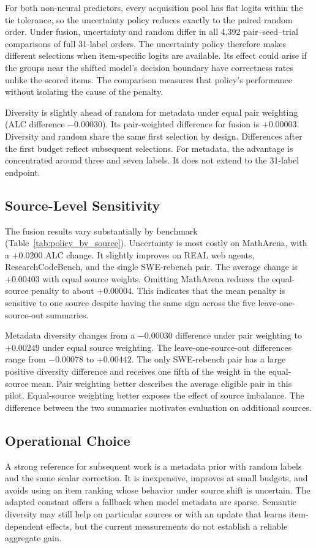 \documentclass[conference]{IEEEtran}
\begin{document}
For both non-neural predictors, every acquisition pool has flat logits within the tie tolerance, so the uncertainty policy reduces exactly to the paired random order. Under fusion, uncertainty and random differ in all 4,392 pair--seed--trial comparisons of full 31-label orders. The uncertainty policy therefore makes different selections when item-specific logits are available. Its effect could arise if the groups near the shifted model's decision boundary have correctness rates unlike the scored items. The comparison measures that policy's performance without isolating the cause of the penalty.

Diversity is slightly ahead of random for metadata under equal pair weighting (ALC difference $-0.00030$). Its pair-weighted difference for fusion is $+0.00003$. Diversity and random share the same first selection by design. Differences after the first budget reflect subsequent selections. For metadata, the advantage is concentrated around three and seven labels. It does not extend to the 31-label endpoint.

\subsection{Source-Level Sensitivity}
The fusion results vary substantially by benchmark (Table~\ref{tab:policy_by_source}). Uncertainty is most costly on MathArena, with a $+0.0200$ ALC change. It slightly improves on REAL web agents, ResearchCodeBench, and the single SWE-rebench pair. The average change is $+0.00403$ with equal source weights. Omitting MathArena reduces the equal-source penalty to about $+0.00004$. This indicates that the mean penalty is sensitive to one source despite having the same sign across the five leave-one-source-out summaries.

Metadata diversity changes from a $-0.00030$ difference under pair weighting to $+0.00249$ under equal source weighting. The leave-one-source-out differences range from $-0.00078$ to $+0.00442$. The only SWE-rebench pair has a large positive diversity difference and receives one fifth of the weight in the equal-source mean. Pair weighting better describes the average eligible pair in this pilot. Equal-source weighting better exposes the effect of source imbalance. The difference between the two summaries motivates evaluation on additional sources.

\subsection{Operational Choice}
A strong reference for subsequent work is a metadata prior with random labels and the same scalar correction. It is inexpensive, improves at small budgets, and avoids using an item ranking whose behavior under source shift is uncertain. The adapted constant offers a fallback when model metadata are sparse. Semantic diversity may still help on particular sources or with an update that learns item-dependent effects, but the current measurements do not establish a reliable aggregate gain.
\end{document}
